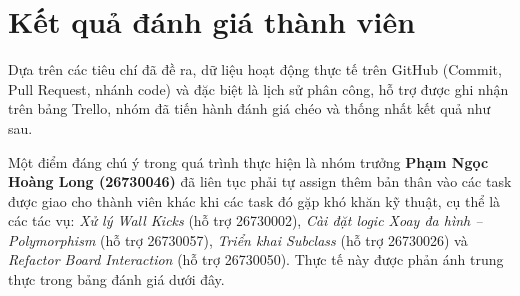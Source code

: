 \section{Kết quả đánh giá thành viên}

Dựa trên các tiêu chí đã đề ra, dữ liệu hoạt động thực tế trên GitHub (Commit, Pull Request, nhánh code) và đặc biệt là lịch sử phân công, hỗ trợ được ghi nhận trên bảng Trello, nhóm đã tiến hành đánh giá chéo và thống nhất kết quả như sau.

Một điểm đáng chú ý trong quá trình thực hiện là nhóm trưởng \textbf{Phạm Ngọc Hoàng Long (26730046)} đã liên tục phải tự assign thêm bản thân vào các task được giao cho thành viên khác khi các task đó gặp khó khăn kỹ thuật, cụ thể là các tác vụ: \textit{Xử lý Wall Kicks} (hỗ trợ 26730002), \textit{Cài đặt logic Xoay đa hình -- Polymorphism} (hỗ trợ 26730057), \textit{Triển khai Subclass} (hỗ trợ 26730026) và \textit{Refactor Board Interaction} (hỗ trợ 26730050). Thực tế này được phản ánh trung thực trong bảng đánh giá dưới đây.

